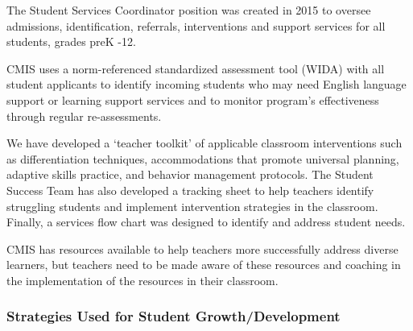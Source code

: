 \begin{findings}
The Student Services Coordinator position was created in 2015 to oversee admissions, identification, referrals, interventions and support services for all students, grades preK -12.

CMIS uses a norm-referenced standardized assessment tool (WIDA) with all student applicants to identify incoming students who may need English language support or learning support services and to monitor program’s effectiveness through regular re-assessments.
 
We have developed a ‘teacher toolkit’ of applicable classroom interventions such as differentiation techniques, accommodations that promote universal planning, adaptive skills practice, and behavior management protocols. The Student Success Team has also developed a tracking sheet to help teachers identify struggling students and implement intervention strategies in the classroom. Finally, a services flow chart was designed to identify and address student needs.


CMIS has resources available to help teachers more successfully address diverse learners, but teachers need to be made aware of these resources and coaching in the implementation of the resources in their classroom.
\end{findings}

\subsubsection{Strategies Used for Student Growth/Development}



